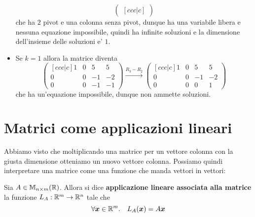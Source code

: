 \begin{solution}
\begin{itemize}
\[\begin{pmatrix}[ccc|c]
            \end{pmatrix}    
        \] che ha $2$ pivot e una colonna senza pivot, dunque ha una variabile libera e nessuna equazione impossibile, quindi ha infinite soluzioni e la dimensione dell'insieme delle soluzioni e' $1$.
        \item Se $k = 1$ allora la matrice diventa \[
            \begin{pmatrix}[ccc|c]
                1&0&5&5\\0&0&-1&-2\\0&0&-1&-1
            \end{pmatrix} \xrightarrow[]{R_3-R_2} 
            \begin{pmatrix}[ccc|c]
                1&0&5&5\\0&0&-1&-2\\0&0&0&1
            \end{pmatrix}
        \] che ha un'equazione impossibile, dunque non ammette soluzioni.
    \end{itemize}
\end{solution}

\section{Matrici come applicazioni lineari}

Abbiamo visto che moltiplicando una matrice per un vettore colonna con la giusta dimensione otteniamo un nuovo vettore colonna. Possiamo quindi interpretare una matrice come una funzione che manda vettori in vettori:
\begin{definition}
    Sia $A \in \mathbb{M}_{n \times m}(\mathbb{R})$. Allora si dice \textbf{applicazione lineare associata alla matrice} la funzione $L_A : \mathbb{R}^m \to \mathbb{R}^n$ tale che \begin{equation}
        \forall \bm x \in \mathbb{R}^m. \quad L_A(\bm x) = A \bm x
    \end{equation}
\end{definition}


